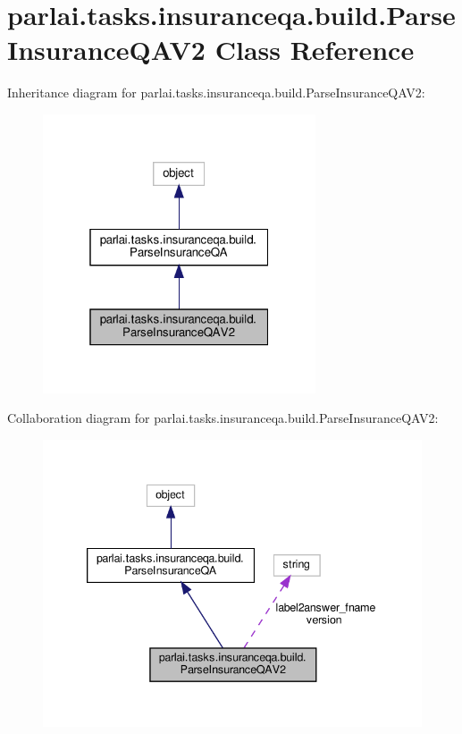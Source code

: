 \hypertarget{classparlai_1_1tasks_1_1insuranceqa_1_1build_1_1ParseInsuranceQAV2}{}\section{parlai.\+tasks.\+insuranceqa.\+build.\+Parse\+Insurance\+Q\+A\+V2 Class Reference}
\label{classparlai_1_1tasks_1_1insuranceqa_1_1build_1_1ParseInsuranceQAV2}


Inheritance diagram for parlai.\+tasks.\+insuranceqa.\+build.\+Parse\+Insurance\+Q\+A\+V2\+:
\nopagebreak
\begin{figure}[H]
\begin{center}
\leavevmode
\includegraphics[width=229pt]{d0/d7c/classparlai_1_1tasks_1_1insuranceqa_1_1build_1_1ParseInsuranceQAV2__inherit__graph}
\end{center}
\end{figure}


Collaboration diagram for parlai.\+tasks.\+insuranceqa.\+build.\+Parse\+Insurance\+Q\+A\+V2\+:
\nopagebreak
\begin{figure}[H]
\begin{center}
\leavevmode
\includegraphics[width=339pt]{df/d63/classparlai_1_1tasks_1_1insuranceqa_1_1build_1_1ParseInsuranceQAV2__coll__graph}
\end{center}
\end{figure}
